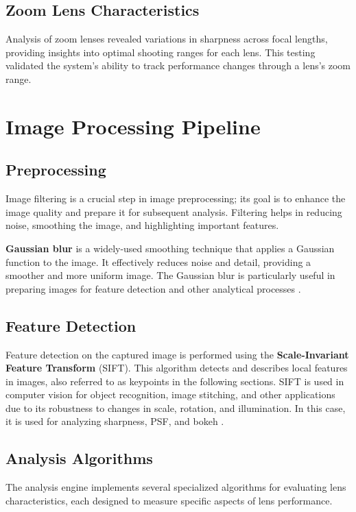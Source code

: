 \subsection{Zoom Lens Characteristics}
Analysis of zoom lenses revealed variations in sharpness across focal lengths, providing insights into optimal shooting ranges for each lens. This testing validated the system's ability to track performance changes through a lens's zoom range.

\section{Image Processing Pipeline}

\subsection{Preprocessing}
Image filtering is a crucial step in image preprocessing; its goal is to enhance the image quality and prepare it for subsequent analysis. Filtering helps in reducing noise, smoothing the image, and highlighting important features.

\textbf{Gaussian blur} is a widely-used smoothing technique that applies a Gaussian function to the image. It effectively reduces noise and detail, providing a smoother and more uniform image. The Gaussian blur is particularly useful in preparing images for feature detection and other analytical processes \cite{gaussian}.

\subsection{Feature Detection}
Feature detection on the captured image is performed using the \textbf{Scale-Invariant Feature Transform} (SIFT). This algorithm detects and describes local features in images, also referred to as keypoints in the following sections. SIFT is used in computer vision for object recognition, image stitching, and other applications due to its robustness to changes in scale, rotation, and illumination. In this case, it is used for analyzing sharpness, PSF, and bokeh \cite{Sift}.

\subsection{Analysis Algorithms}
The analysis engine implements several specialized algorithms for evaluating lens characteristics, each designed to measure specific aspects of lens performance.

